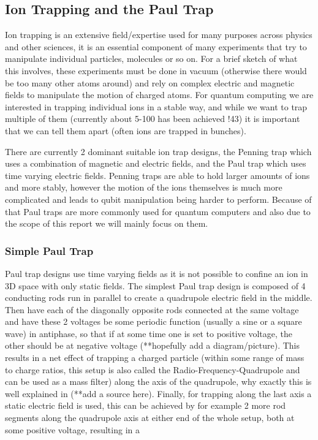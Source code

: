 \begin{itemize}
\subsection{Ion Trapping and the Paul Trap}
Ion trapping is an extensive field/expertise used for many purposes across physics and other sciences, it is an essential component of many experiments that try to manipulate individual particles, molecules or so on.
For a brief sketch of what this involves, these experiments must be done in vacuum (otherwise there would be too many other atoms around) and rely on complex electric and magnetic fields to manipulate the motion of charged atoms.
For quantum computing we are interested in trapping individual ions in a stable way, and while we want to trap multiple of them (currently about 5-100 has been achieved !43) it is important that we can tell them apart (often ions are trapped in bunches).

There are currently 2 dominant suitable ion trap designs, the Penning trap which uses a combination of magnetic and electric fields, and the Paul trap which uses time varying electric fields.
Penning traps are able to hold larger amounts of ions and more stably, however the motion of the ions themselves is much more complicated and leads to qubit manipulation being harder to perform.
Because of that Paul traps are more commonly used for quantum computers and also due to the scope of this report we will mainly focus on them.

\subsubsection{Simple Paul Trap}
Paul trap designs use time varying fields as it is not possible to confine an ion in 3D space with only static fields.
The simplest Paul trap design is composed of 4 conducting rods run in parallel to create a quadrupole electric field in the middle.
Then have each of the diagonally opposite rods connected at the same voltage and have these 2 voltages be some periodic function (usually a sine or a square wave) in antiphase, so that if at some time one is set to positive voltage, the other should be at negative voltage (**hopefully add a diagram/picture).
This results in a net effect of trapping a charged particle (within some range of mass to charge ratios, this setup is also called the Radio-Frequency-Quadrupole and can be used as a mass filter) along the axis of the quadrupole, why exactly this is well explained in (**add a source here).
Finally, for trapping along the last axis a static electric field is used, this can be achieved by for example 2 more rod segments along the quadrupole axis at either end of the whole setup, both at some positive voltage, resulting in a 



\end{itemize}
